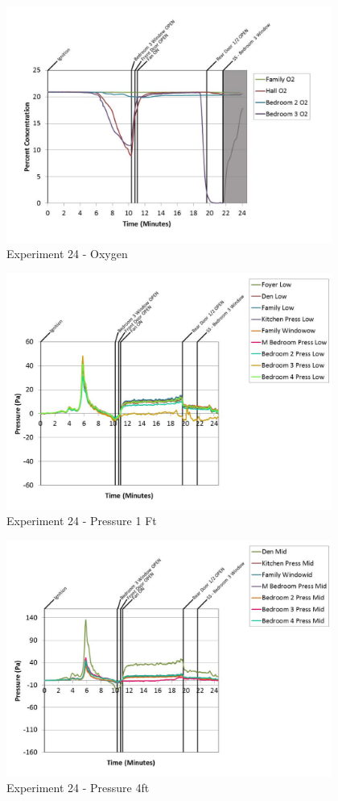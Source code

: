 \documentclass{article}
\begin{document}
\begin{appendices}
	\begin{figure}[h!]
		\centering
		\includegraphics[height=3.05in]{0_Images/Results_Charts/Exp_24_Charts/Oxygen.pdf}
		\caption{Experiment 24 - Oxygen}
	\end{figure}
 
	\clearpage

	\begin{figure}[h!]
		\centering
		\includegraphics[height=3.05in]{0_Images/Results_Charts/Exp_24_Charts/Pressure1Ft.pdf}
		\caption{Experiment 24 - Pressure 1 Ft}
	\end{figure}
 

	\begin{figure}[h!]
		\centering
		\includegraphics[height=3.05in]{0_Images/Results_Charts/Exp_24_Charts/Pressure4ft.pdf}
		\caption{Experiment 24 - Pressure 4ft}
	\end{figure}
 

\end{appendices}
\end{document}
